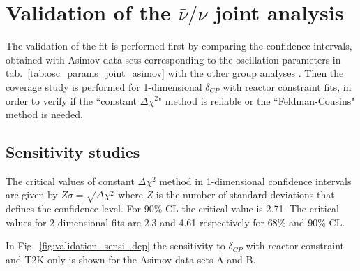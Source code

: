 \clearpage

\section{Validation of the $\bar{\nu}/\nu$ joint analysis}
\label{sec:validation}

The validation of the fit is performed first by comparing the confidence intervals, obtained
with Asimov data sets corresponding to the oscillation parameters in tab.~\ref{tab:osc_params_joint_asimov}
with the other group analyses \cite{Mach3JointFitRun16}.
Then the coverage study is performed for 1-dimensional $\delta_{CP}$ with reactor constraint fits,
in order to verify if the ``constant $\Delta \chi^2$" method is reliable or
the ``Feldman-Cousins" method is needed.


%
%

\subsection{Sensitivity studies}
\label{sec:sensi}

The critical values of constant $\Delta \chi^2$ method
in 1-dimensional confidence intervals are given 
by $Z\sigma = \sqrt{\Delta \chi^2}$  
where $Z$ is the number of standard deviations that
defines the confidence level.
For 90\% CL the critical value is 2.71.
The critical values for 2-dimensional fits are 2.3 and 4.61
respectively for 68\% and 90\% CL.

In Fig.~\ref{fig:validation_sensi_dcp} the sensitivity to $\delta_{CP}$ 
with reactor constraint and T2K only is shown for the Asimov data sets A and B.

